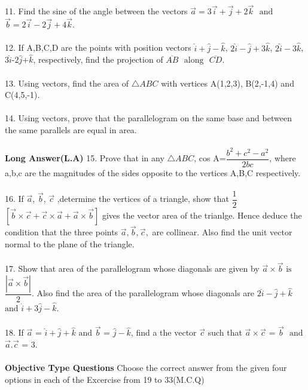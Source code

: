 \documentclass{article}
\begin{document}
\\
\\
11. Find the sine of the angle between the vectors $\vec{a}=3\vec{i}+\vec{j}+2\vec{k}$ $\text{ and }$ $\vec{b}=2\vec{i}-2\vec{j}+4\vec{k}$.
\\
\\
12. If A,B,C,D  are the points with position vectors $\hat{i}+\hat{j}-\hat{k}$, $2\hat{i}-\hat{j}+3\hat{k}$, $2\hat{i}-3\hat{k}$, $3\hat{i}$-$2\hat{j}$+$\hat{k}$, respectively, find the projection of $\overline{AB}$ $\text{ along }$ $\overline{CD}$.
\\
\\
13. Using vectors, find the area of $\triangle{ABC}$ with vertices A(1,2,3), B(2,-1,4) and C(4,5,-1).
\\
\\
14. Using vectors, prove that the parallelogram on the same base and between the same parallels are equal in area.
\\
\\
\textbf{Long Answer(L.A)}
15. Prove that in any $\triangle{ABC}$, cos A=$\dfrac{b^2+c^2-a^2}{2bc}$, where a,b,c are the magnitudes of the sides opposite to the vertices A,B,C respectively.
\\
\\
16. If $\vec{a}$, $\vec{b}$, $\vec{c}$ ,determine the vertices of a triangle, show that $\dfrac{1}{2}$ $\left[\vec{b} \times\vec{c}+\vec{c} \times\vec{a}+\vec{a}\times\vec{b} \right]$ gives the vector area of the trianlge. Hence deduce the condition that the three points $\vec{a},\vec{b},\vec{c},$ are collinear. Also find the unit vector normal to the plane of the triangle.
\\
\\
17. Show that area of the parallelogram whose diagonals are given by $\vec{a}\times\vec{b}$ $\text{is}$ $\dfrac{|\vec{a}\times\vec{b}|}{2}$. Also find the area of the parallelogram whose diagonals are $2\hat{i}-\hat{j}+\hat{k}$ $\text{and}$ $\hat{i}+3\hat{j}-\hat{k}$.
\\
\\
18. If $\vec{a}$ = $\hat{i}+\hat{j}+\hat{k}$ $\text{and}$ $\vec{b}$ = $\hat{j}-\hat{k}$, find a the vector $\vec{c}$ such that $\vec{a}\times\vec{c}$ = $\vec{b}$ $\text{ and}$ $\vec{a}$.$\vec{c}$ = 3.
\\
\\
\textbf{Objective Type Questions}
Choose the correct answer from the given four options in each of the Excercise from 19 to 33(M.C.Q)
\\
\\
\end{document}
